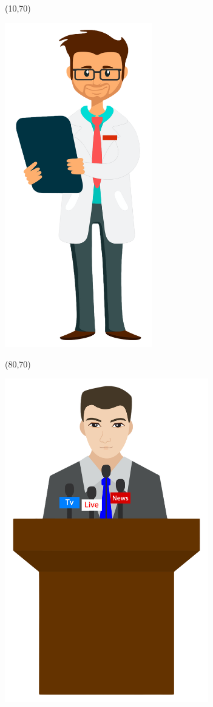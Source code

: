 \documentclass[hyperref={pdfpagelabels=false}]{beamer}
\begin{document}
\begin{frame}
	\begin{textblock}{10}(10,70)
		\begin{blankbox}
			\centering
			\includegraphics[height=400pt]{img/ai97b-ej97b.png}
		\end{blankbox}
	\end{textblock}

	\begin{textblock}{10}(80,70)
		\begin{blankbox}
			\centering
			\includegraphics[height=400pt]{img/arn28-kj5eh.png}
		\end{blankbox}
	\end{textblock}


\end{frame}
\end{document}

